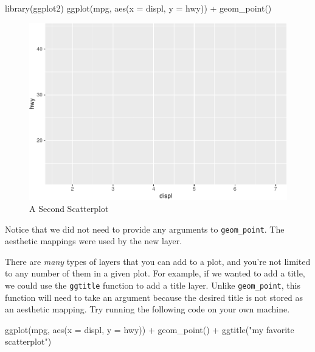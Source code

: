 \documentclass[
  12pt,
]{krantz}
\makeatletter
\newenvironment{Shaded}{\begin{snugshade}}{\end{snugshade}}
\newcommand{\AttributeTok}[1]{\textcolor[rgb]{0.61,0.61,0.61}{#1}}
\newcommand{\FunctionTok}[1]{\textcolor[rgb]{0,0,0}{#1}}
\newcommand{\NormalTok}[1]{#1}
\newcommand{\SpecialCharTok}[1]{\textcolor[rgb]{0,0,0}{#1}}
\newcommand{\StringTok}[1]{\textcolor[rgb]{0.5,0.5,0.5}{#1}}
\newenvironment{kframe}{%
\medskip{}
\setlength{\fboxsep}{.8em}
 \def\at@end@of@kframe{}%
 \ifinner\ifhmode%
  \def\at@end@of@kframe{\end{minipage}}%
  \begin{minipage}{\columnwidth}%
 \fi\fi%
 \def\FrameCommand##1{\hskip\@totalleftmargin \hskip-\fboxsep
 \colorbox{shadecolor}{##1}\hskip-\fboxsep
     \hskip-\linewidth \hskip-\@totalleftmargin \hskip\columnwidth}%
 \MakeFramed {\advance\hsize-\width
   \@totalleftmargin\z@ \linewidth\hsize
   \@setminipage}}%
 {\par\unskip\endMakeFramed%
 \at@end@of@kframe}
\renewenvironment{Shaded}{\begin{kframe}}{\end{kframe}}
\makeatother
\begin{document}
\begin{Shaded}
\begin{Highlighting}[]
\FunctionTok{library}\NormalTok{(ggplot2)}
\FunctionTok{ggplot}\NormalTok{(mpg, }\FunctionTok{aes}\NormalTok{(}\AttributeTok{x =}\NormalTok{ displ, }\AttributeTok{y =}\NormalTok{ hwy))  }\SpecialCharTok{+}
  \FunctionTok{geom\_point}\NormalTok{()}
\end{Highlighting}
\end{Shaded}

\begin{figure}
\centering
\includegraphics{r_and_python_book_files/figure-latex/unnamed-chunk-169-1.pdf}
\caption{\label{fig:unnamed-chunk-169}A Second Scatterplot}
\end{figure}

Notice that we did not need to provide any arguments to \texttt{geom\_point}. The aesthetic mappings were used by the new layer.

There are \emph{many} types of layers that you can add to a plot, and you're not limited to any number of them in a given plot. For example, if we wanted to add a title, we could use the \texttt{ggtitle} function to add a title layer. Unlike \texttt{geom\_point}, this function will need to take an argument because the desired title is not stored as an aesthetic mapping. Try running the following code on your own machine.

\begin{Shaded}
\begin{Highlighting}[]
\FunctionTok{ggplot}\NormalTok{(mpg, }\FunctionTok{aes}\NormalTok{(}\AttributeTok{x =}\NormalTok{ displ, }\AttributeTok{y =}\NormalTok{ hwy))  }\SpecialCharTok{+}
  \FunctionTok{geom\_point}\NormalTok{() }\SpecialCharTok{+} 
  \FunctionTok{ggtitle}\NormalTok{(}\StringTok{"my favorite scatterplot"}\NormalTok{)}
\end{Highlighting}
\end{Shaded}
\end{document}
